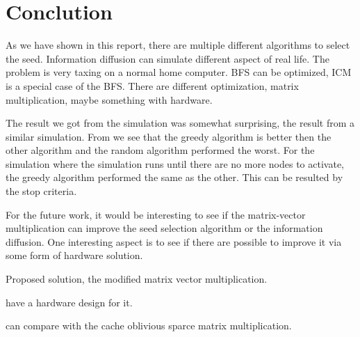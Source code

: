 \chapter{Conclution}
As we have shown in this report, there are multiple different algorithms to select the seed. Information diffusion can simulate different aspect of real life. The problem is very taxing on a normal home computer. BFS can be optimized, ICM is a special case of the BFS. There are different optimization, matrix multiplication, maybe something with hardware. 

The result we got from the simulation was somewhat surprising, the result from a similar simulation\cite{MaximizedSpread2003}. From \cite{MaximizedSpread2003} we see that the greedy algorithm is better then the other algorithm and the random algorithm performed the worst. For the simulation where the simulation runs until there are no more nodes to activate, the greedy algorithm performed the same as the other. This can be resulted by the stop criteria.

For the future work, it would be interesting to see if the matrix-vector multiplication can improve the seed selection algorithm or the information diffusion. One interesting aspect is to see if there are possible to improve it via some form of hardware solution.

Proposed solution, the modified matrix vector multiplication.

have a hardware design for it.

can compare with the cache oblivious sparce matrix multiplication.